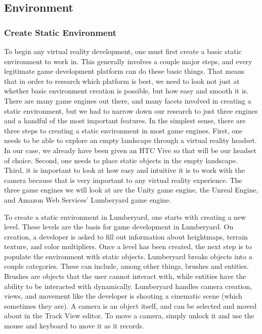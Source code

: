 \documentclass[10pt,journal,compsoc,onecolumn, draftclsnofoot]{IEEEtran}
\begin{document}
\subsection{Environment}
\subsubsection{Create Static Environment}

To begin any virtual reality development, one must first create a basic static environment to work in. This generally involves a couple major steps, and every legitimate game development platform can do these basic things.
That means that in order to research which platform is best, we need to look not just at whether basic environment creation is possible, but how easy and smooth it is.
There are many game engines out there, and many facets involved in creating a static environment, but we had to narrow down our research to just three engines and a handful of the most important features.
In the simplest sense, there are three steps to creating a static environment in most game engines.
First, one needs to be able to explore an empty landscape through a virtual reality headset.
In our case, we already have been given an HTC Vive so that will be our headset of choice.
Second, one needs to place static objects in the empty landscape.
Third, it is important to look at how easy and intuitive it is to work with the camera because that is very important to any virtual reality experience.
The three game engines we will look at are the Unity game engine, the Unreal Engine, and Amazon Web Services' Lumberyard game engine.

To create a static environment in Lumberyard, one starts with creating a new level.  These levels are the basis for game development in Lumberyard. \cite{lumberyard_levels_environment}
On creation, a developer is asked to fill out information about heightmaps, terrain texture, and color multipliers.
Once a level has been created, the next step is to populate the environment with static objects.
Lumberyard breaks objects into a couple categories.  These can include, among other things, brushes and entities.
Brushes are objects that the user cannot interact with, while entities have the ability to be interacted with dynamically. \cite{lumberyard_object_system}
Lumberyard handles camera creation, views, and movement like the developer is shooting a cinematic scene (which sometimes they are).
A camera is an object itself, and can be selected and moved about in the Track View editor.  To move a camera, simply unlock it and use the mouse and keyboard to move it as it records. \cite{lumberyard_object_system}
\end{document}
